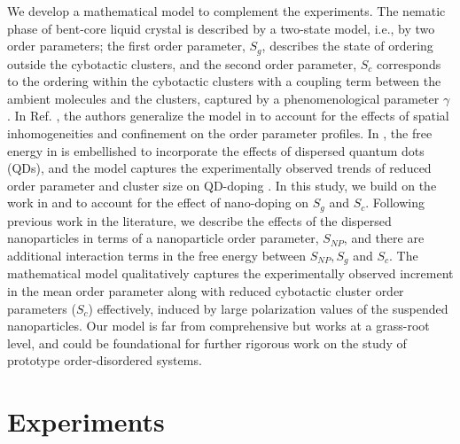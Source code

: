 \documentclass[reprint,amsfonts,amsmath,amssymb,aps,pre,floatfix,10pt]{revtex4-1}
\begin{document}
We develop a mathematical model to complement the experiments. The nematic phase of bent-core liquid crystal is described by a two-state model, i.e., by two order parameters; the first order parameter, $S_g$, describes the state of ordering outside the cybotactic clusters, and the second order parameter, $S_c$ corresponds to the ordering within the cybotactic clusters with a coupling term between the ambient molecules and the clusters, captured by a phenomenological parameter $\gamma$ \cite{madhusudana2017two_36}. In Ref. \cite{patranabish2019one_37}, the authors generalize the model in \cite{madhusudana2017two_36} to account for the effects of spatial inhomogeneities and confinement on the order parameter profiles. In \cite{patranabish2021quantum_38}, the free energy in \cite{patranabish2019one_37} is embellished to incorporate the effects of dispersed quantum dots (QDs), and the model captures the experimentally observed trends of reduced order parameter and cluster size on QD-doping \cite{patranabish2021quantum_38}. In this study, we build on the work in \cite{madhusudana2017two_36} and \cite{patranabish2019one_37} to account for the effect of nano-doping on $S_g$ and $S_c$. Following previous work in the literature, we describe the effects of the dispersed nanoparticles in terms of a nanoparticle order parameter, $S_{NP}$, and there are additional interaction terms in the free energy between $S_{NP}, S_g$ and $S_c$. The mathematical model qualitatively captures the experimentally observed increment in the mean order parameter along with reduced cybotactic cluster order parameters ($S_c$) effectively, induced by large polarization values of the suspended nanoparticles. Our model is far from comprehensive but works at a grass-root level, and could be foundational for further rigorous work on the study of prototype order-disordered systems.




\section{Experiments}
\end{document}
